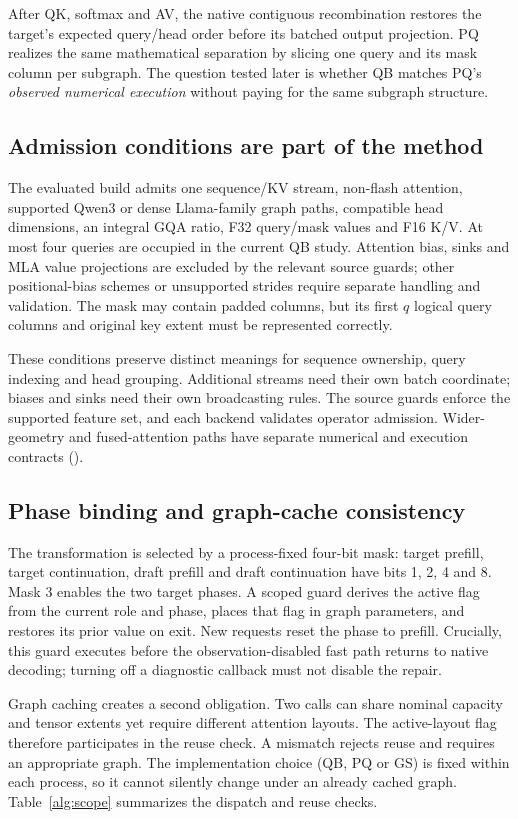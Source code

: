 After QK, softmax and AV, the native contiguous recombination restores the target's expected query/head order before its batched output projection. PQ realizes the same mathematical separation by slicing one query and its mask column per subgraph. The question tested later is whether QB matches PQ's \emph{observed numerical execution} without paying for the same subgraph structure.

\subsection{Admission conditions are part of the method}
The evaluated build admits one sequence/KV stream, non-flash attention, supported Qwen3 or dense Llama-family graph paths, compatible head dimensions, an integral GQA ratio, F32 query/mask values and F16 K/V. At most four queries are occupied in the current QB study. Attention bias, sinks and MLA value projections are excluded by the relevant source guards; other positional-bias schemes or unsupported strides require separate handling and validation. The mask may contain padded columns, but its first $q$ logical query columns and original key extent must be represented correctly.

These conditions preserve distinct meanings for sequence ownership, query indexing and head grouping. Additional streams need their own batch coordinate; biases and sinks need their own broadcasting rules. The source guards enforce the supported feature set, and each backend validates operator admission. Wider-geometry and fused-attention paths have separate numerical and execution contracts ().

\subsection{Phase binding and graph-cache consistency}
The transformation is selected by a process-fixed four-bit mask: target prefill, target continuation, draft prefill and draft continuation have bits 1, 2, 4 and 8. Mask 3 enables the two target phases. A scoped guard derives the active flag from the current role and phase, places that flag in graph parameters, and restores its prior value on exit. New requests reset the phase to prefill. Crucially, this guard executes before the observation-disabled fast path returns to native decoding; turning off a diagnostic callback must not disable the repair.

Graph caching creates a second obligation. Two calls can share nominal capacity and tensor extents yet require different attention layouts. The active-layout flag therefore participates in the reuse check. A mismatch rejects reuse and requires an appropriate graph. The implementation choice (QB, PQ or GS) is fixed within each process, so it cannot silently change under an already cached graph. Table~\ref{alg:scope} summarizes the dispatch and reuse checks.

